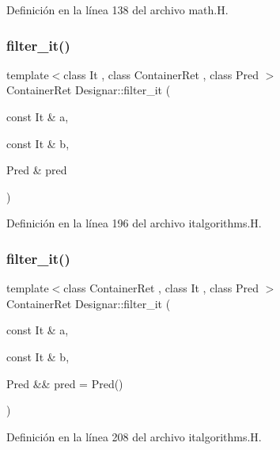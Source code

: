 Definición en la línea 138 del archivo math.\+H.

\mbox{\label{namespace_designar_a2e9a7f0c3737ea50acaaa849e78792ac}} 
\subsubsection{\texorpdfstring{filter\+\_\+it()}{filter\_it()}\hspace{0.1cm}{\footnotesize\ttfamily [1/2]}}
{\footnotesize\ttfamily template$<$class It , class Container\+Ret , class Pred $>$ \\
Container\+Ret Designar\+::filter\+\_\+it (\begin{DoxyParamCaption}\item[{const It \&}]{a,  }\item[{const It \&}]{b,  }\item[{Pred \&}]{pred }\end{DoxyParamCaption})}



Definición en la línea 196 del archivo italgorithms.\+H.

\mbox{\label{namespace_designar_a0eadd36ecf06d087630130873fdc6a49}} 
\subsubsection{\texorpdfstring{filter\+\_\+it()}{filter\_it()}\hspace{0.1cm}{\footnotesize\ttfamily [2/2]}}
{\footnotesize\ttfamily template$<$class Container\+Ret , class It , class Pred $>$ \\
Container\+Ret Designar\+::filter\+\_\+it (\begin{DoxyParamCaption}\item[{const It \&}]{a,  }\item[{const It \&}]{b,  }\item[{Pred \&\&}]{pred = {\ttfamily Pred()} }\end{DoxyParamCaption})}



Definición en la línea 208 del archivo italgorithms.\+H.

\mbox{\label{namespace_designar_a52cb61c301573a55b73956eed7d86ed9}} 
